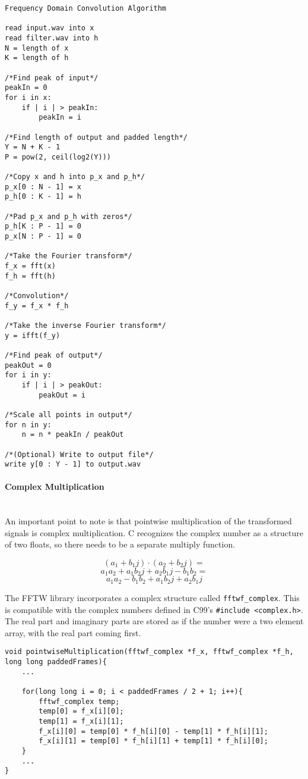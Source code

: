 \begin{verbatim}
Frequency Domain Convolution Algorithm

read input.wav into x
read filter.wav into h
N = length of x
K = length of h

/*Find peak of input*/
peakIn = 0
for i in x:
    if | i | > peakIn:
        peakIn = i

/*Find length of output and padded length*/
Y = N + K - 1
P = pow(2, ceil(log2(Y)))

/*Copy x and h into p_x and p_h*/
p_x[0 : N - 1] = x
p_h[0 : K - 1] = h

/*Pad p_x and p_h with zeros*/
p_h[K : P - 1] = 0
p_x[N : P - 1] = 0

/*Take the Fourier transform*/
f_x = fft(x)
f_h = fft(h)

/*Convolution*/
f_y = f_x * f_h

/*Take the inverse Fourier transform*/
y = ifft(f_y)
        
/*Find peak of output*/
peakOut = 0
for i in y:
    if | i | > peakOut:
        peakOut = i
        
/*Scale all points in output*/
for n in y:
    n = n * peakIn / peakOut

/*(Optional) Write to output file*/
write y[0 : Y - 1] to output.wav
\end{verbatim}

\paragraph{Complex Multiplication} \hspace{0pt} \\
\indent An important point to note is that pointwise multiplication of the transformed signals is complex multiplication. C recognizes the complex number as a structure of two floats, so there needs to be a separate multiply function. 

$$(a_1 + b_1j) \cdot (a_2 + b_2j) = $$
$$a_1a_2 + a_1b_2j + a_2b_1j - b_1b_2 =$$
$$ a_1a_2 - b_1b_2 + a_1b_2j + a_2b_1j$$

The FFTW library incorporates a complex structure called \verb|fftwf_complex|. This is compatible with the complex numbers defined in C99's \verb|#include <complex.h>|. The real part and imaginary parts are stored as if the number were a two element array, with the real part coming first.
\begin{verbatim}
void pointwiseMultiplication(fftwf_complex *f_x, fftwf_complex *f_h,  long long paddedFrames){
    ...
   
    for(long long i = 0; i < paddedFrames / 2 + 1; i++){
        fftwf_complex temp;
        temp[0] = f_x[i][0];
        temp[1] = f_x[i][1];
        f_x[i][0] = temp[0] * f_h[i][0] - temp[1] * f_h[i][1];
        f_x[i][1] = temp[0] * f_h[i][1] + temp[1] * f_h[i][0];
    }
    ...
}
\end{verbatim}

